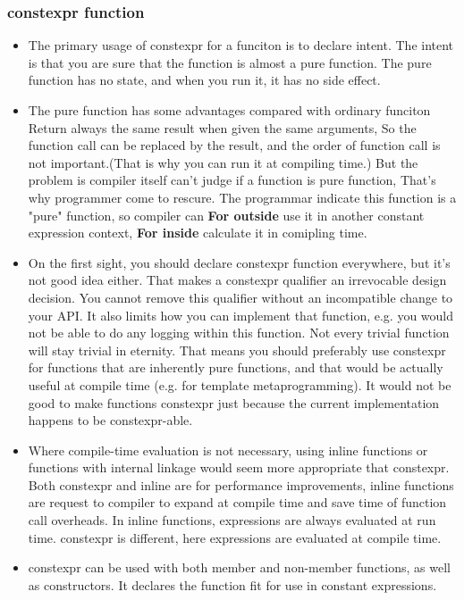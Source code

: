 \documentclass[a4paper,12pt,twoside]{book}
\begin{document}
\subsubsection{constexpr function}
\begin{itemize}
	\item The primary usage of constexpr for a funciton is to declare intent. The intent is that you are sure that the function is almost a pure function. The pure function has no state, and when you run it, it has no side effect.
	\item The pure function has some advantages compared with ordinary funciton Return always the same result when given the same arguments, So the function call can be replaced by the result, and the order of function call is not important.(That is why you can run it at compiling time.) But the problem is compiler itself can't judge if a function is pure function, That's why programmer come to rescure. The programmar indicate this function is a "pure" function, so compiler can \textbf{For outside} use it in another constant expression context, \textbf{For inside} calculate it in comipling time. 
	
	\item On the first sight, you should declare constexpr function everywhere, but it's not good idea either. That makes a constexpr qualifier an irrevocable design decision. You cannot remove this qualifier without an incompatible change to your API. It also limits how you can implement that function, e.g. you would not be able to do any logging within this function. Not every trivial function will stay trivial in eternity. That means you should preferably use constexpr for functions that are inherently pure functions, and that would be actually useful at compile time (e.g. for template metaprogramming). It would not be good to make functions constexpr just because the current implementation happens to be constexpr-able.
	
	\item Where compile-time evaluation is not necessary, using inline functions or functions with internal linkage would seem more appropriate that constexpr. Both constexpr and inline are for performance improvements, inline functions are request to compiler to expand at compile time and save time of function call overheads. In inline functions, expressions are always evaluated at run time. constexpr is different, here expressions are evaluated at compile time.
	
	\item constexpr can be used with both member and non-member functions, as well as constructors. It declares the function fit for use in constant expressions. 
	

\end{itemize}
\end{document}
